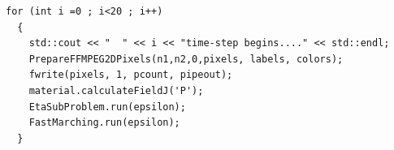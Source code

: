 \documentclass[11pt]{article}
\begin{document}
\begin{tcolorbox}
\begin{lstlisting}[basicstyle=\footnotesize]
  for (int i =0 ; i<20 ; i++)
  {
    std::cout << "  " << i << "time-step begins...." << std::endl;
    PrepareFFMPEG2DPixels(n1,n2,0,pixels, labels, colors);
    fwrite(pixels, 1, pcount, pipeout);
    material.calculateFieldJ('P');
    EtaSubProblem.run(epsilon);
    FastMarching.run(epsilon);
  }
\end{lstlisting}
\end{tcolorbox}







%    
%    
%    
%     
%    
%    
%     
%
\end{document}
